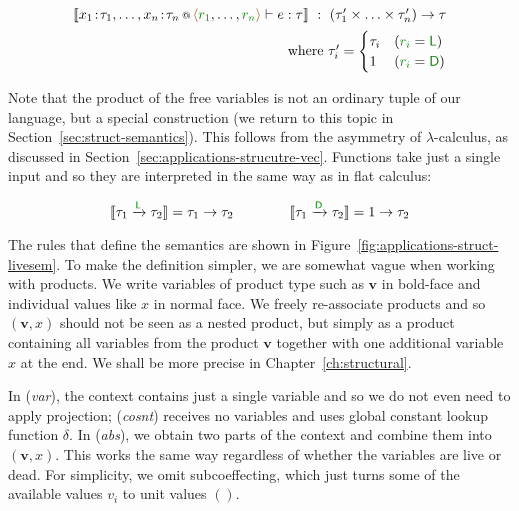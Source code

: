 \begin{equation*}
\begin{array}{r}
\\[-0.5em]
\sem{\coctx{x_1\!:\!\tau_1, \ldots, x_n\!:\!\tau_n}{ \alift{\cclrd{r_1}, \ldots, \cclrd{r_n}} } \vdash e : \tau}
  ~:~ (\tau'_1 \times \ldots \times \tau'_n) \rightarrow \tau\\[0.5em]
\textnormal{where}~\tau'_i = \begin{cases}
\tau_i & (\cclrd{r_i} = \cclrd{\cclrd{\ident{L}}})\\
1      & (\cclrd{r_i} = \cclrd{\cclrd{\ident{D}}})
\end{cases}
\end{array}
\end{equation*}
\vspace{0.5em}

\noindent
Note that the product of the free variables is not an ordinary tuple of our language, but a special
construction (we return to this topic in Section~\ref{sec:struct-semantics}). This follows from the
asymmetry of $\lambda$-calculus, as discussed in Section~\ref{sec:applications-strucutre-vec}. Functions
take just a single input and so they are interpreted in the same way as in flat calculus:

\vspace{-0.5em}
\begin{equation*}
\sem{\tau_1 \xrightarrow{\aclrd{\cclrd{\ident{L}}}} \tau_2} = \tau_1 \rightarrow \tau_2 \qquad\qquad
\sem{\tau_1 \xrightarrow{\aclrd{\cclrd{\ident{D}}}} \tau_2} = 1 \rightarrow \tau_2
\end{equation*}
\vspace{-0.5em}

\noindent
The rules that define the semantics are shown in Figure~\ref{fig:applications-struct-livesem}.
To make the definition simpler, we are somewhat vague when working with products. We write
variables of product type such as $\mathbf{v}$ in bold-face and individual values like $x$ in
normal face. We freely re-associate products and so $(\mathbf{v}, x)$ should not be seen as a
nested product, but simply as a product containing all variables from the product $\mathbf{v}$
together with one additional variable $x$ at the end. We shall be more precise in
Chapter~\ref{ch:structural}.

In (\emph{var}), the context contains just a single variable and so we do not even need to apply
projection; (\emph{cosnt}) receives no variables and uses global constant lookup function $\delta$.
In (\emph{abs}), we obtain two parts of the context and combine them into $(\mathbf{v}, x)$. This
works the same way regardless of whether the variables are live or dead. For simplicity, we omit
subcoeffecting, which just turns some of the available values $v_i$ to unit values $()$.

